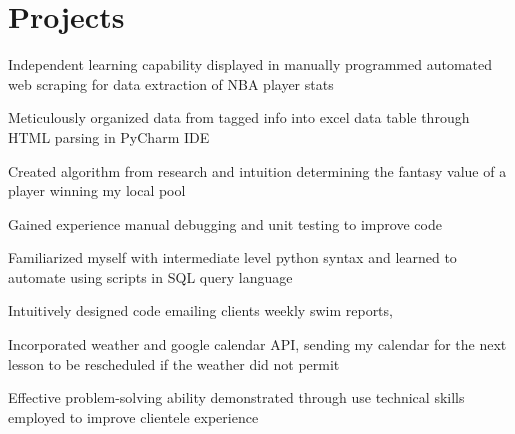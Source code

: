 \documentclass[letterpaper]{deedy-resume} %
\begin{document}
\begin{minipage}[t]{0.66\textwidth} %

\section{Projects}


\vspace{\topsep} %
\begin{tightitemize}
\vspace{2pt}

\item Independent learning capability displayed in manually programmed automated web scraping for data extraction of NBA player stats
\item Meticulously organized data from tagged info into excel data table through HTML parsing in PyCharm IDE 
\item Created algorithm from research and intuition determining the fantasy value of a player winning my local pool  
\item Gained experience manual debugging and unit testing to improve code 


\end{tightitemize}
\sectionspace 
\vspace{3pt}

\begin{tightitemize}


\item Familiarized myself with intermediate level python syntax and learned to automate using scripts in SQL query language 
\item Intuitively designed code emailing clients weekly swim reports,


\item Incorporated weather and google calendar API, sending my calendar for the next lesson to be rescheduled if the weather did not permit



\item Effective problem-solving ability demonstrated through use technical skills employed to improve clientele experience 
\end{tightitemize}


\end{minipage}
\end{document}
